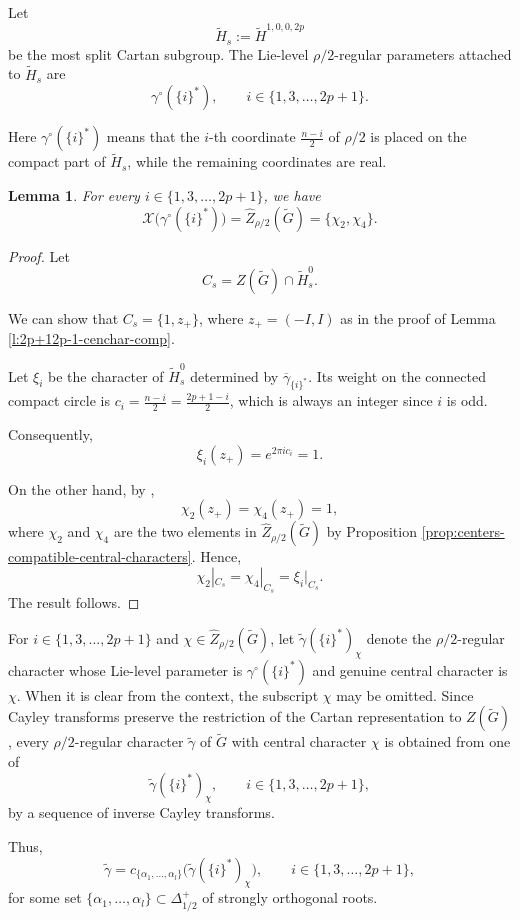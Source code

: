 \documentclass{amsart}
\newtheorem{lemma}[thm]{Lemma}
\theoremstyle{definition}
\newcommand{\tu}{\widetilde}
\begin{document}
Let
\[
\widetilde H_s:=\widetilde H^{1,0,0,2p}
\]
be the most split Cartan subgroup. The Lie-level
\(\rho/2\)-regular parameters attached to \(\widetilde H_s\) are
\[
\gamma^\circ(\{i\}^*),
\qquad
i\in\{1,3,\ldots,2p+1\}.
\]

Here \(\gamma^\circ(\{i\}^*)\) means that the \(i\)-th coordinate
$\displaystyle\frac{n-i}{2}$
of
$\rho/2$
is placed on the compact part of \(\widetilde H_s\), while the
remaining coordinates are real.


\begin{lemma}
For every \(i\in\{1,3,\ldots,2p+1\}\), we have
\[
\mathcal X\bigl(\gamma^\circ(\{i\}^*)\bigr)
=
\widehat Z_{\rho/2}(\widetilde G) =\{\chi_2, \chi_4\}.
\]
\end{lemma}
\begin{proof}
Let
\[
C_s
=
Z(\widetilde G)\cap \widetilde H_s^0.
\]

We can show that $C_s=\{1,z_+\}$, where $z_+=(-I, I)$ as in the proof of Lemma \ref{l:2p+12p-1-cenchar-comp}. 


Let \(\xi_i\) be the character of \(\widetilde H_s^0\) determined by
$\overline\gamma_{\{ i\}^*}$. Its weight on the connected compact circle is
$c_i=\displaystyle\frac{n-i}{2}=\frac{2p+1-i}{2}$, which is always an integer since $i$ is odd. 

Consequently,
\[
\xi_i(z_+)
=
e^{2\pi i c_i}
=1. \]

On the other hand, 
by  \cite[Lemma 6.2]{BTs18},
\[
\chi_2(z_+)=\chi_4(z_+)=1,
\]
where $\chi_2$ and $\chi_4$ are the two elements in $\widehat{Z}_{\rho/2}(\tu G)$ by Proposition \ref{prop:centers-compatible-central-characters}. Hence,
$$
\chi_2|_{C_s} = \chi_4|_{C_s}=\xi_i|_{C_s}.
$$
The result follows.
\end{proof}


For \(i\in\{1,3,\ldots,2p+1\}\) and $\chi\in \widehat Z_{\rho/2}(\tu G)$,  let
$\widetilde\gamma(\{i\}^*)_\chi$
denote the  \(\rho/2\)-regular character whose Lie-level
parameter is \(\gamma^\circ(\{i\}^*)\) and genuine central character is $\chi$. When it is clear from the context, the subscript $\chi$ may be omitted. 
Since Cayley transforms preserve the restriction of the Cartan
representation to \(Z(\widetilde G)\), every \(\rho/2\)-regular 
character $\tu\gamma$ of \(\widetilde G\) with central character \(\chi\) is
obtained from one of
\[
\widetilde\gamma(\{i\}^*)_\chi,
\qquad
i\in\{1,3,\ldots,2p+1\},
\]
by a sequence of inverse Cayley transforms. 

Thus,
\[
\widetilde\gamma
=
c_{\{\alpha_1,\ldots,\alpha_l\}}
\bigl(\widetilde\gamma(\{i\}^*)_\chi \bigr),
\qquad  i\in\{1,3,\ldots,2p+1\},
\]
for some set
\(\{\alpha_1,\ldots,\alpha_l\}\subset\Delta_{1/2}^+\)
of strongly orthogonal roots.
\end{document}
